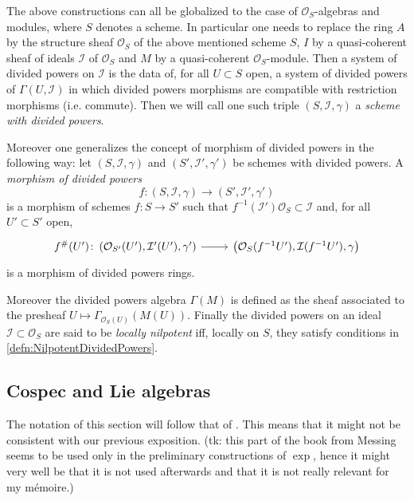 \documentclass[../Main]{subfiles}
\begin{document}
\begin{rem}[]\label{rem:DividedPowersSheaf}
	The above constructions can all be globalized to the case of
	$\mathcal{O}_S$-algebras and modules, where $S$ denotes a scheme.
	In particular one needs to replace the ring $A$ by the 
	structure sheaf $\mathcal{O}_{ S }$ of the above mentioned scheme $S$,
	$I$ by a quasi-coherent sheaf of ideals $\mathcal{I}$ of $\mathcal{O}_S$ and
	$M$ by a quasi-coherent $\mathcal{O}_S$-module.
	Then a system of divided powers on $\mathcal{I}$ is the data
	of, for all $U \subset S$ open, a system of divided powers of
	$\Gamma(U,\mathcal{I})$ in which divided powers morphisms 
	are compatible with restriction morphisms (i.e. commute).
	Then we will call one such triple $\left(S, \mathcal{I}, \gamma\right)$
	a {\em scheme with divided powers}.

	Moreover one generalizes the concept of morphism of divided powers in the following way:
	let $\left(S, \mathcal{I}, \gamma\right)$ and $\left(S', \mathcal{I}', \gamma'\right)$
	be schemes with divided powers.
	A {\em morphism of divided powers}
	\begin{equation*}
	f\colon \left(S, \mathcal{I}, \gamma\right) \to 
	\left(S', \mathcal{I}', \gamma'\right)
	\end{equation*}
	is a morphism of schemes
	$f\colon S \to S'$ such that
	$f^{-1}(\mathcal{I}') \mathcal{O}_S \subset \mathcal{I}$
	and, for all $U' \subset S'$ open,
	\begin{equation*}
	\begin{tikzcd}[row sep = 0ex
		,/tikz/column 1/.append style={anchor=base east}
		,/tikz/column 2/.append style={anchor=base west}]
		f^\#(U')\colon 
		\left(\mathcal{O}_{S'}(U'), \mathcal{I}'(U'), \gamma'\right)
		\arrow[r, "", rightarrow] &
		\left(\mathcal{O}_{ S }(f^{-1}U'), \mathcal{I}(f^{-1}U'), \gamma\right)
	\end{tikzcd}
	\end{equation*} 
	is a morphism of divided powers rings.

	Moreover the divided powers algebra $\Gamma(M)$ is defined
	as the sheaf associated to the presheaf 
	$U \mapsto \Gamma_{\mathcal{O}_S(U)}(M(U))$.
	Finally the divided powers on an ideal $\mathcal{I} \subset \mathcal{O}_S$
	are said to be {\em locally nilpotent} iff,
	locally on $S$, they satisfy conditions in \cref{defn:NilpotentDividedPowers}.
\end{rem}


\subsection{Cospec and Lie algebras}
The notation of this section will follow that of \cite[Capther III]{Messing}.
This means that it might not be consistent with our previous exposition.
(tk: this part of the book from Messing seems to be used only in the preliminary
constructions of $\exp$, hence it might very well be that it is not used afterwards
and that it is not really relevant for my m\'emoire.)
\end{document}
